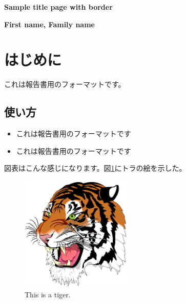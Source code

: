 \documentclass[dvipdfmx, fontsize=12pt]{jlreq}
\newcommand{\登録番号}{TR23-1001094-01}
\begin{document}
\begin{center}
        \vspace*{1cm}

        \huge
        \textbf{Sample title page with border}

        \vspace{2.0cm}
        \LARGE
        \textbf{First name, Family name}

        \vfill
\end{center}
\newpage

\lipsum[1-5]

\newpage

\section{はじめに}
これは報告書用のフォーマットです。

\subsection{使い方}
\begin{itemize}
    \item これは報告書用のフォーマットです
    \item これは報告書用のフォーマットです
\end{itemize}

図表はこんな感じになります。図\ref{tiger}にトラの絵を示した。
\begin{figure}
    \centering
    \includegraphics[keepaspectratio=true,width=0.47\textwidth]{tiger.png}
    \caption{This is a tiger.}
    \label{tiger}
\end{figure}
\end{document}
